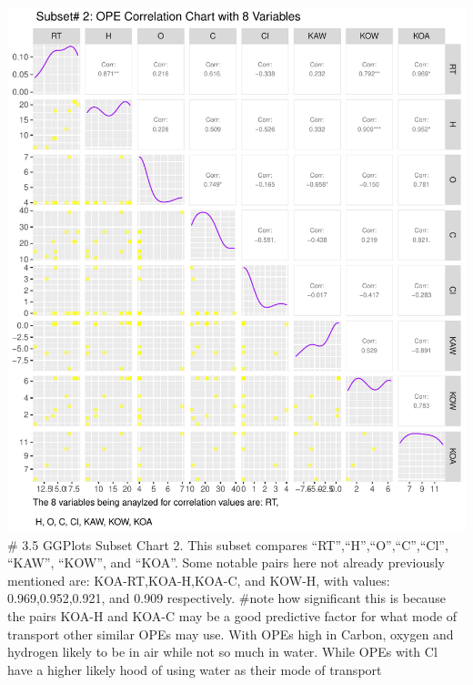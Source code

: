 \documentclass[journal=jacsat,manuscript=article]{achemso}
\begin{document}
\includegraphics{Rahmi_Chowdhury_500621744_Final_project_files/figure-latex/unnamed-chunk-6-1.pdf}
\# 3.5 GGPlots Subset Chart 2. This subset compares
``RT'',``H'',``O'',``C'',``Cl'', ``KAW'', ``KOW'', and ``KOA''. Some
notable pairs here not already previously mentioned are:
KOA-RT,KOA-H,KOA-C, and KOW-H, with values: 0.969,0.952,0.921, and 0.909
respectively. \#note how significant this is because the pairs KOA-H and
KOA-C may be a good predictive factor for what mode of transport other
similar OPEs may use. With OPEs high in Carbon, oxygen and hydrogen
likely to be in air while not so much in water. While OPEs with Cl have
a higher likely hood of using water as their mode of transport
\end{document}
